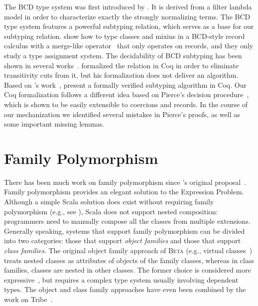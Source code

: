 The BCD type system was first introduced by \citet{Barendregt_1983}. It is
derived from a filter lambda model in order to characterize exactly the strongly
normalizing terms. The BCD type system features a powerful subtyping relation,
which serves as a base for our subtyping relation.
\citet{DBLP:journals/corr/BessaiDDCd15} show how to type classes and mixins in
a BCD-style record calculus with a merge-like operator~\citep{bracha1990mixin}
that only operates on records, and they only study a type assignment system. The
decidability of BCD subtyping has been shown in several
works~\citep{pierce1989decision, Kurata_1995, Rehof_2011, Statman_2015}.
\citet{laurent2012intersection} formalized the relation in Coq in order to
eliminate transitivity cuts from it, but his formalization does not deliver an
algorithm. Based on \citeauthor{Statman_2015}'s work~\citep{Statman_2015},
\citet{bessaiextracting} present a formally verified subtyping algorithm in Coq.
Our Coq formalization follows a different idea based on Pierce's decision
procedure~\citep{pierce1989decision}, which is shown to be easily extensible to
coercions and records. In the course of our mechanization we identified several
mistakes in Pierce's proofs, as well as some important missing lemmas.

\section{Family Polymorphism}

There has been much work on family polymorphism since \citeauthor{Ernst_2001}'s
original proposal~\citep{Ernst_2001}. Family polymorphism provides an elegant
solution to the Expression Problem. Although a simple Scala solution does exist
without requiring family polymorphism (e.g., see \citet{wang2016expression}), Scala does not support nested composition:
programmers need to manually compose all the classes from multiple extensions.
Generally speaking, systems that support family polymorphism can be divided into
two categories: those that support \textit{object families} and those that
support \textit{class families}. The original object family approach of
\textsc{Beta }(e.g., virtual classes~\citep{Madsen_1989}) treats nested classes as
attributes of objects of the family classes, whereas in class families,
classes are nested in other classes. The former choice is considered more
expressive~\citep{ErnstVirtual}, but requires a complex type system usually
involving dependent types. The object and class family approaches have even been
combined by the work on Tribe~\citep{pubsdoc:tribe-virtual-calculus}.

